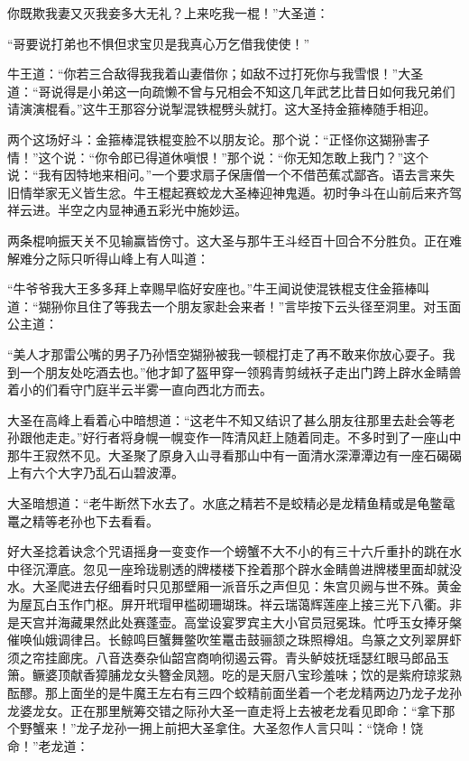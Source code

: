 \documentclass[12pt,UTF8]{ctexbook}
\begin{document}
你既欺我妻又灭我妾多大无礼？上来吃我一棍！”大圣道：

“哥要说打弟也不惧但求宝贝是我真心万乞借我使使！”

牛王道：“你若三合敌得我我着山妻借你；如敌不过打死你与我雪恨！”大圣道：“哥说得是小弟这一向疏懒不曾与兄相会不知这几年武艺比昔日如何我兄弟们请演演棍看。”这牛王那容分说掣混铁棍劈头就打。这大圣持金箍棒随手相迎。

两个这场好斗：金箍棒混铁棍变脸不以朋友论。那个说：“正怪你这猢狲害子情！”这个说：“你令郎已得道休嗔恨！”那个说：“你无知怎敢上我门？”这个说：“我有因特地来相问。”一个要求扇子保唐僧一个不借芭蕉忒鄙吝。语去言来失旧情举家无义皆生忿。牛王棍起赛蛟龙大圣棒迎神鬼遁。初时争斗在山前后来齐驾祥云进。半空之内显神通五彩光中施妙运。

两条棍响振天关不见输赢皆傍寸。这大圣与那牛王斗经百十回合不分胜负。正在难解难分之际只听得山峰上有人叫道：

“牛爷爷我大王多多拜上幸赐早临好安座也。”牛王闻说使混铁棍支住金箍棒叫道：“猢狲你且住了等我去一个朋友家赴会来者！”言毕按下云头径至洞里。对玉面公主道：

“美人才那雷公嘴的男子乃孙悟空猢狲被我一顿棍打走了再不敢来你放心耍子。我到一个朋友处吃酒去也。”他才卸了盔甲穿一领鸦青剪绒袄子走出门跨上辟水金睛兽着小的们看守门庭半云半雾一直向西北方而去。

大圣在高峰上看着心中暗想道：“这老牛不知又结识了甚么朋友往那里去赴会等老孙跟他走走。”好行者将身幌一幌变作一阵清风赶上随着同走。不多时到了一座山中那牛王寂然不见。大圣聚了原身入山寻看那山中有一面清水深潭潭边有一座石碣碣上有六个大字乃乱石山碧波潭。

大圣暗想道：“老牛断然下水去了。水底之精若不是蛟精必是龙精鱼精或是龟鳖鼋鼍之精等老孙也下去看看。

好大圣捻着诀念个咒语摇身一变变作一个螃蟹不大不小的有三十六斤重扑的跳在水中径沉潭底。忽见一座玲珑剔透的牌楼楼下拴着那个辟水金睛兽进牌楼里面却就没水。大圣爬进去仔细看时只见那壁厢一派音乐之声但见：朱宫贝阙与世不殊。黄金为屋瓦白玉作门枢。屏开玳瑁甲槛砌珊瑚珠。祥云瑞蔼辉莲座上接三光下八衢。非是天宫并海藏果然此处赛蓬壶。高堂设宴罗宾主大小官员冠冕珠。忙呼玉女捧牙槃催唤仙娥调律吕。长鲸鸣巨蟹舞鳖吹笙鼍击鼓骊颔之珠照樽俎。鸟篆之文列翠屏虾须之帘挂廊庑。八音迭奏杂仙韶宫商响彻遏云霄。青头鲈妓抚瑶瑟红眼马郎品玉箫。鳜婆顶献香獐脯龙女头簪金凤翘。吃的是天厨八宝珍羞味；饮的是紫府琼浆熟酝醪。那上面坐的是牛魔王左右有三四个蛟精前面坐着一个老龙精两边乃龙子龙孙龙婆龙女。正在那里觥筹交错之际孙大圣一直走将上去被老龙看见即命：“拿下那个野蟹来！”龙子龙孙一拥上前把大圣拿住。大圣忽作人言只叫：“饶命！饶命！”老龙道：
\end{document}
